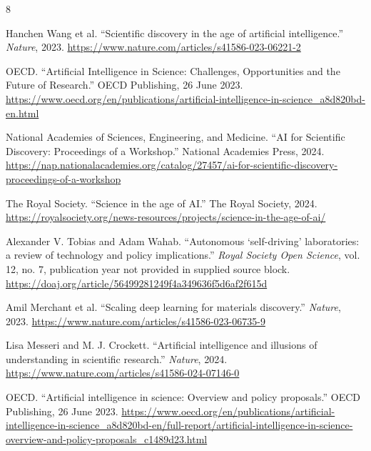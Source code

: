 \documentclass[12pt]{article}
\begin{document}
\begin{thebibliography}{8}

Hanchen Wang et al. ``Scientific discovery in the age of artificial intelligence.'' \textit{Nature}, 2023. \url{https://www.nature.com/articles/s41586-023-06221-2}

OECD. ``Artificial Intelligence in Science: Challenges, Opportunities and the Future of Research.'' OECD Publishing, 26 June 2023. \url{https://www.oecd.org/en/publications/artificial-intelligence-in-science_a8d820bd-en.html}

National Academies of Sciences, Engineering, and Medicine. ``AI for Scientific Discovery: Proceedings of a Workshop.'' National Academies Press, 2024. \url{https://nap.nationalacademies.org/catalog/27457/ai-for-scientific-discovery-proceedings-of-a-workshop}

The Royal Society. ``Science in the age of AI.'' The Royal Society, 2024. \url{https://royalsociety.org/news-resources/projects/science-in-the-age-of-ai/}

Alexander V. Tobias and Adam Wahab. ``Autonomous `self-driving' laboratories: a review of technology and policy implications.'' \textit{Royal Society Open Science}, vol. 12, no. 7, publication year not provided in supplied source block. \url{https://doaj.org/article/56499281249f4a349636f5d6af2f615d}

Amil Merchant et al. ``Scaling deep learning for materials discovery.'' \textit{Nature}, 2023. \url{https://www.nature.com/articles/s41586-023-06735-9}

Lisa Messeri and M. J. Crockett. ``Artificial intelligence and illusions of understanding in scientific research.'' \textit{Nature}, 2024. \url{https://www.nature.com/articles/s41586-024-07146-0}

OECD. ``Artificial intelligence in science: Overview and policy proposals.'' OECD Publishing, 26 June 2023. \url{https://www.oecd.org/en/publications/artificial-intelligence-in-science_a8d820bd-en/full-report/artificial-intelligence-in-science-overview-and-policy-proposals_c1489d23.html}

\end{thebibliography}
\end{document}
